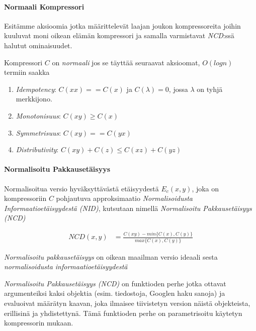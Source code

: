 \documentclass[11pt,finnish]{tktltiki2}
\theoremstyle{definition}
\theoremstyle{remark}
\begin{document}
\paragraph{Normaali Kompressori} %
\label{par:normaali_kompressori}

  Esitämme aksioomia jotka määrittelevät laajan joukon kompressoreita joihin kuuluvat moni oikean elämän kompressori ja samalla varmistavat  \emph{NCD}:ssä halutut ominaisuudet.

  Kompressori $C$ on \emph{normaali} jos se täyttää seuraavat aksioomat, $O(log n)$ termiin saakka

  \begin{enumerate}
    \item \emph{Idempotency}: $C(xx) == C(x)$ ja $C(\lambda) = 0$, jossa $\lambda$ on tyhjä merkkijono.
    \item \emph{Monotonisuus}: $C(xy) \geq C(x)$
    \item \emph{Symmetrisuus}: $C(xy) == C(yx)$
    \item \emph{Distributivity}: $C(xy) + C(z) \leq C(xz) + C(yz)$
  \end{enumerate}


\paragraph{Normalisoitu Pakkausetäisyys} %
\label{par:normalisoitu_pakkauset_isyys}

  Normalisoitua versio hyväksyttävästä etäisyydestä $E_c(x,y)$, joka on kompressoriin $C$ pohjautuva approksimaatio \emph{Normalisoidusta Informaatioetäisyydestä (NID)}, kutsutaan nimellä \emph{Normalisoitu Pakkausetäisyys (NCD)} \cite{CV05}

  \begin{align*}
    NCD(x,y) &= \frac{C(xy)-min\{C(x),C(y)\}}{max\{C(x),C(y)\}}
  \end{align*}

  \emph{Normalisoitu pakkausetäisyys} on oikean maailman versio ideaali sesta \emph{normalisoidusta informaatioetäisyydestä}

  \emph{Normalisoitu Pakkausetäisyys (NCD)} on funktioden perhe jotka ottavat argumenteiksi kaksi objektia (esim. tiedostoja, Googlen haku sanoja) ja evaluoivat määrätyn kaavan, joka ilmaisee tiivistetyn version näistä objekteista, erillisinä ja yhdistettynä. Tämä funktioden perhe on parametrisoitu käytetyn kompressorin mukaan.
\end{document}
